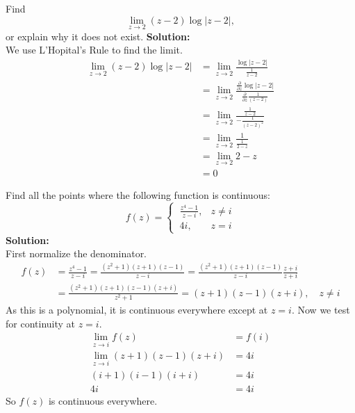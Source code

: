 \begin{example}
    Find
    $$\lim_{z\to2}(z-2)\log|z-2|,$$
    or explain why it does not exist.
    \textbf{Solution:} \\
    We use L'Hopital's Rule to find the limit.
    \begin{align}
        \lim_{z \to 2} (z-2)\log|z-2| & = \lim_{z \to 2} \frac{\log|z-2|}{\frac{1}{z-2}} \nonumber                                                         \\
                                      & = \lim_{z \to 2} \frac{\frac{\partial}{\partial z}\log|z-2|}{\frac{\partial}{\partial z}\frac{1}{(z-2)}} \nonumber \\
                                      & = \lim_{z \to 2} \frac{\frac{1}{z-2}}{-\frac{1}{(z-2)^2}} \nonumber                                                \\
                                      & = \lim_{z \to 2} \frac{1}{\frac{1}{2-z}} \nonumber                                                                 \\
                                      & = \lim_{z \to 2} 2-z \nonumber                                                                                     \\
                                      & = 0 \nonumber
    \end{align}
\end{example}

\begin{example}
    Find all the points where the following function is continuous:
    $$f(z)=\begin{cases}\:\frac{z^4-1}{z-i},&z\neq i\\\:4i,&z=i\end{cases}$$
    \textbf{Solution:} \\
    First normalize the denominator.
    \begin{align*}
        f(z) & = \frac{z^4-1}{z-i} = \frac{(z^2+1)(z+1)(z-1)}{z-i} = \frac{(z^2+1)(z+1)(z-1)}{z-i}\frac{z+i}{z+i} \\
             & = \frac{(z^2+1)(z+1)(z-1)(z+i)}{z^2+1} = (z+1)(z-1)(z+i), \quad z \neq i
    \end{align*}
    As this is a polynomial, it is continuous everywhere except at $z=i$. Now we test for continuity at $z=i$.
    \begin{align*}
        \lim_{z \to i} f(z)           & = f(i) \\
        \lim_{z \to i}(z+1)(z-1)(z+i) & = 4i   \\
        (i+1)(i-1)(i+i)               & = 4i   \\
        4i                            & = 4i
    \end{align*}
    So $f(z)$ is continuous everywhere.
\end{example}


